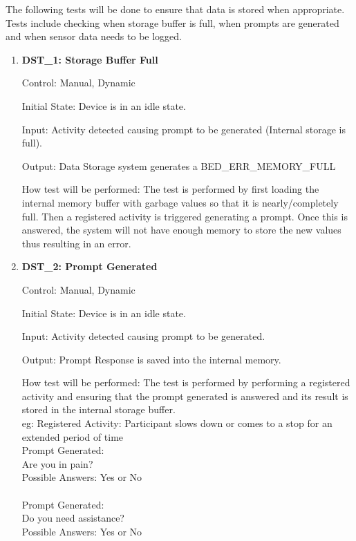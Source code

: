 \documentclass[12pt, titlepage]{article}
\begin{document}
The following tests will be done to ensure that data is stored when appropriate. Tests include checking when storage buffer is full, when prompts are generated and when sensor data needs to be logged. 
\begin{enumerate}
	\item{\textbf{DST\_1: Storage Buffer Full} \\}\label{DST1}
	
		Control: Manual, Dynamic
							
		Initial State: Device is in an idle state.
							
		Input: Activity detected causing prompt to be generated (Internal storage is full).
		
		Output: Data Storage system generates a BED\_ERR\_MEMORY\_FULL
		
		How test will be performed: The test is performed by first loading the internal memory buffer with garbage values so that it is nearly/completely full. Then a registered activity is triggered generating a 					prompt. Once this is answered, the system will not have enough memory to store the new values thus resulting in an error.

	\item{\textbf{DST\_2: Prompt Generated} \\}\label{DST2}
	
		Control: Manual, Dynamic
							
		Initial State: Device is in an idle state.
							
		Input: Activity detected causing prompt to be generated.
		
		Output: Prompt Response is saved into the internal memory.
		
		How test will be performed: The test is performed by performing a registered activity and ensuring that the prompt generated is answered and its result is stored in the internal storage buffer.\\
		eg: Registered Activity: Participant slows down or comes to a stop for an extended period of time\\
		Prompt Generated: \\
		Are you in pain?\\
		Possible Answers: Yes or No\\
		\\
		Prompt Generated: \\
		Do you need assistance?\\
		Possible Answers: Yes or No\\


\end{enumerate}
\end{document}
